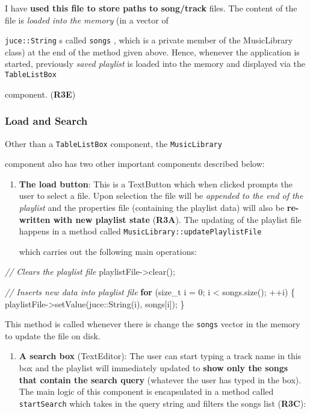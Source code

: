 \documentclass[12pt,]{article}
\newenvironment{Shaded}{}{}
\newcommand{\CommentTok}[1]{\textcolor[rgb]{0.38,0.63,0.69}{\textit{#1}}}
\newcommand{\ControlFlowTok}[1]{\textcolor[rgb]{0.00,0.44,0.13}{\textbf{#1}}}
\newcommand{\DataTypeTok}[1]{\textcolor[rgb]{0.56,0.13,0.00}{#1}}
\newcommand{\DecValTok}[1]{\textcolor[rgb]{0.25,0.63,0.44}{#1}}
\newcommand{\NormalTok}[1]{#1}
\providecommand{\tightlist}{%
  \setlength{\itemsep}{0pt}\setlength{\parskip}{0pt}}
\let\oldtexttt\texttt
\renewcommand{\texttt}[1]{
  \colorbox{bgcolor}{\oldtexttt{#1}}
}
\begin{document}
I have \textbf{used this file to store paths to song/track} files. The
content of the file is \emph{loaded into the memory} (in a vector of
\texttt{juce::String}s called \texttt{songs}, which is a private member
of the MusicLibrary class) at the end of the method given above. Hence,
whenever the application is started, previously \emph{saved playlist} is
loaded into the memory and displayed via the \texttt{TableListBox}
component. (\textbf{R3E})

\hypertarget{load-and-search}{%
\subsubsection{Load and Search}\label{load-and-search}}

Other than a \texttt{TableListBox} component, the \texttt{MusicLibrary}
component also has two other important components described below:

\begin{enumerate}
\def\labelenumi{\arabic{enumi}.}
\tightlist
\item
  \textbf{The load button}: This is a TextButton which when clicked
  prompts the user to select a file. Upon selection the file will be
  \emph{appended to the end of the playlist} and the properties file
  (containing the playlist data) will also be \textbf{re-written with
  new playlist state} (\textbf{R3A}). The updating of the playlist file
  happens in a method called \texttt{MusicLibrary::updatePlaylistFile}
  which carries out the following main operations:
\end{enumerate}

\begin{Shaded}
\begin{Highlighting}[]

\CommentTok{// Clears the playlist file}
\NormalTok{playlistFile->clear();}


\CommentTok{// Inserts new data into playlist file}
\ControlFlowTok{for}\NormalTok{ (}\DataTypeTok{size_t}\NormalTok{ i = }\DecValTok{0}\NormalTok{; i < songs.size(); ++i)}
\NormalTok{\{}
\NormalTok{    playlistFile->setValue(juce::String(i), songs[i]);}
\NormalTok{\}}
\end{Highlighting}
\end{Shaded}

This method is called whenever there is change the \texttt{songs} vector
in the memory to update the file on disk.

\begin{enumerate}
\def\labelenumi{\arabic{enumi}.}
\setcounter{enumi}{1}
\tightlist
\item
  \textbf{A search box} (TextEditor): The user can start typing a track
  name in this box and the playlist will immediately updated to
  \textbf{show only the songs that contain the search query} (whatever
  the user has typed in the box). The main logic of this component is
  encapsulated in a method called \texttt{startSearch} which takes in
  the query string and filters the songs list (\textbf{R3C}):
\end{enumerate}
\end{document}
